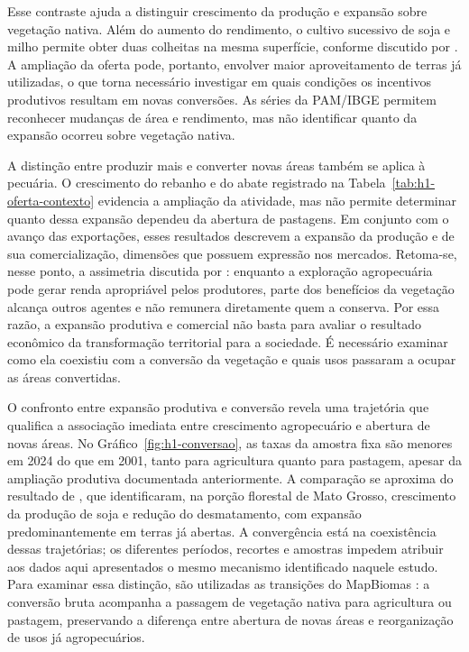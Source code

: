 Esse contraste ajuda a distinguir crescimento da produção e expansão sobre vegetação nativa. Além do aumento do rendimento, o cultivo sucessivo de soja e milho permite obter duas colheitas na mesma superfície, conforme discutido por . A ampliação da oferta pode, portanto, envolver maior aproveitamento de terras já utilizadas, o que torna necessário investigar em quais condições os incentivos produtivos resultam em novas conversões. As séries da PAM/IBGE \cite{IBGEPAM2026} permitem reconhecer mudanças de área e rendimento, mas não identificar quanto da expansão ocorreu sobre vegetação nativa.

A distinção entre produzir mais e converter novas áreas também se aplica à pecuária. O crescimento do rebanho e do abate registrado na Tabela~\ref{tab:h1-oferta-contexto} evidencia a ampliação da atividade, mas não permite determinar quanto dessa expansão dependeu da abertura de pastagens. Em conjunto com o avanço das exportações, esses resultados descrevem a expansão da produção e de sua comercialização, dimensões que possuem expressão nos mercados. Retoma-se, nesse ponto, a assimetria discutida por : enquanto a exploração agropecuária pode gerar renda apropriável pelos produtores, parte dos benefícios da vegetação alcança outros agentes e não remunera diretamente quem a conserva. Por essa razão, a expansão produtiva e comercial não basta para avaliar o resultado econômico da transformação territorial para a sociedade. É necessário examinar como ela coexistiu com a conversão da vegetação e quais usos passaram a ocupar as áreas convertidas.


\FloatBarrier

O confronto entre expansão produtiva e conversão revela uma trajetória que qualifica a associação imediata entre crescimento agropecuário e abertura de novas áreas. No Gráfico~\ref{fig:h1-conversao}, as taxas da amostra fixa são menores em 2024 do que em 2001, tanto para agricultura quanto para pastagem, apesar da ampliação produtiva documentada anteriormente. A comparação se aproxima do resultado de , que identificaram, na porção florestal de Mato Grosso, crescimento da produção de soja e redução do desmatamento, com expansão predominantemente em terras já abertas. A convergência está na coexistência dessas trajetórias; os diferentes períodos, recortes e amostras impedem atribuir aos dados aqui apresentados o mesmo mecanismo identificado naquele estudo. Para examinar essa distinção, são utilizadas as transições do MapBiomas \cite{MapBiomas2026}: a conversão bruta acompanha a passagem de vegetação nativa para agricultura ou pastagem, preservando a diferença entre abertura de novas áreas e reorganização de usos já agropecuários.

